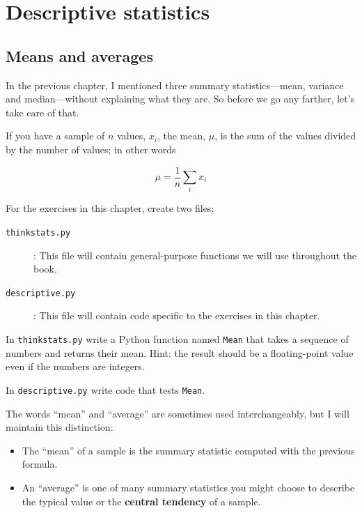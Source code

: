 \documentclass[12pt]{book}
\begin{document}
\chapter{Descriptive statistics}
\label{descriptive}

\section{Means and averages}
\label{mean}

In the previous chapter, I mentioned three summary statistics---mean,
variance and median---without explaining what they are.  So before
we go any farther, let's take care of that.

If you have a sample of $n$ values, $x_i$, the mean, $\mu$, is
the sum of the values divided by the number of values; in other words

\[ \mu = \frac{1}{n} \sum_i x_i \]

\begin{ex}
For the exercises in this chapter, create two files:

\begin{description}

\item[{\tt thinkstats.py}]: This file will contain general-purpose
functions we will use throughout the book.

\item[{\tt descriptive.py}]: This file will contain code specific
to the exercises in this chapter.

\end{description}

In {\tt thinkstats.py} write a Python function named {\tt Mean} that
takes a sequence of numbers and returns their mean.  Hint: the result
should be a floating-point value even if the numbers are integers.

In {\tt descriptive.py} write code that tests {\tt Mean}.

\end{ex}

The words ``mean'' and ``average'' are sometimes used interchangeably,
but I will maintain this distinction:

\begin{itemize}

\item The ``mean'' of a sample is the summary statistic computed with
  the previous formula.

\item An ``average'' is one of many summary statistics you might
  choose to describe the typical value or the
  {\bf central tendency} of a sample.

\end{itemize}
\end{document}
